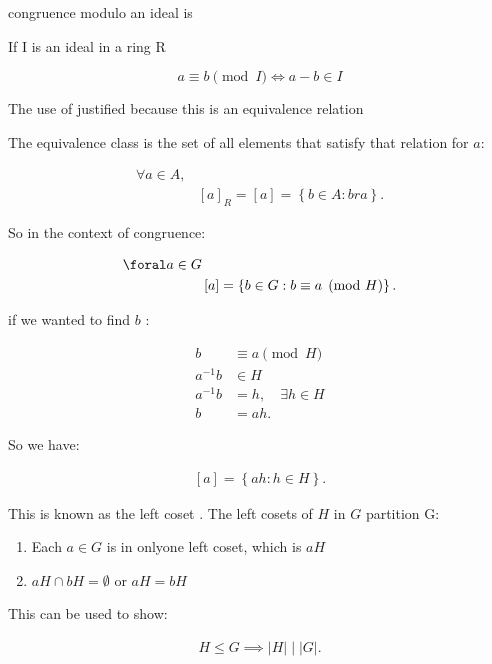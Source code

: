 \documentclass[a4paper,11pt,twoside]{article}
\begin{document}
\begin{enumerate}
congruence modulo an ideal is

If I is an ideal in a ring R

\[
       a\equiv b\pmod{I}\iff a-b\in I
       \]

The use of \equivis justified because this is an equivalence relation

The equivalence class is the set of all elements that satisfy that
relation for \(a\):


\begin{align*}
      \forall a \in A,& \\
                      &\left[ a \right]_R = \left[ a \right] = \left\{b \in A : b r a \right\}
.\end{align*}

So in the context of congruence:

\begin{align*}
      \foral a \in G &\\
                     & \left[ a \right] = \left\{b\in G : b\equiv a \pmod{H}\right\} 
.\end{align*}

if we wanted to find \(b\) :

\begin{align*}
      b &\equiv a \pmod{H}\\
      a^{-1}b &\in H \\
      a^{-1}b &= h, \quad \exists h \in H \\
      b &= ah
.\end{align*}

So we have:

\begin{align*}
      \left[ a \right] = \left\{ah : h \in H\right\} 
.\end{align*}

This is known as the left coset
\cite[\S 6.1]{judsonAbstractAlgebraTheory2016}. The left cosets of \(H\) 
in \(G\) partition G: \cite[\S 3.3]{gregoryleeAbstractAlgebra2018}

\begin{enumerate}
\item Each \(a\in G\) is in onlyone left coset, which is \(aH\)
\item \(aH \cap bH = \emptyset\) or  \(aH=bH\)
\end{enumerate}

This can be used to show:

\begin{align*}
      H \leq G \implies \left\lvert H \right\rvert \mid \left\lvert G \right\rvert
.\end{align*}


\end{enumerate}
\end{document}
